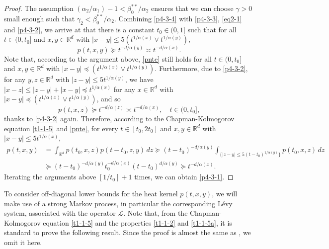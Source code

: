 \documentclass[a4paper,11pt]{amsart}
\renewcommand{\le}{\leqslant}
\newcommand{\R}{\mathds R}
\newcommand{\B}{\beta}
\newcommand{\p}{\preceq}
\newcommand{\q}{\succeq}
\newcommand{\A}{\alpha}
\newcommand{\G}{\gamma}
\def\LL{{\mathcal L}}
\theoremstyle{definition}
\begin{document}
\begin{proof}
The assumption $({\A_2}/{\A_1})-1<{\B_0^{**}}/{\A_2}$ ensures that we can choose
$\G>0$ small enough such that $\G_2 <{\B_0^{**}}/{\A_2}$. Combining \eqref{p4-3-4}
with \eqref{p4-3-3}, \eqref{eq2-1} and \eqref{p4-3-2}, we arrive at that there is a constant $t_0\in(0,1]$ such that for all $t\in (0,t_0]$ and $x,y\in \R^d$ with $|x-y|\le 5(t^{{1}/{\A(x)}}\vee t^{{1}/{\A(y)}})$,
\begin{equation}\label{pnte}
p(t,x,y)\q t^{-{d}/{\A(y)}}\asymp t^{-{d}/{\A(x)}}.
\end{equation}
Note that, according to the argument above, \eqref{pnte} still holds for all $t\in (0,t_0]$ and $x,y\in \R^d$ with $|x-y|\p
(t^{{1}/{\A(x)}}\vee t^{{1}/{\A(y)}})$. Furthermore, due to \eqref{p4-3-2}, for any $y,z\in \R^d$ with $|z-y|\le 5t^{{1}/{\A(y)}}$, we have $|x-z|\le |z-y|+|x-y|\p t^{{1}/{\A(x)}}$ for any $x\in \R^d$ with $|x-y|\p (t^{1/\A(x)}\vee t^{1/\A(y)})$, and so $$p(t,x,z)\q t^{-{d}/{\A(z)}}\asymp t^{-{d}/{\A(x)}},\quad t\in (0,t_0],$$ thanks to \eqref{p4-3-2} again. Therefore, according to the Chapman-Kolmogorov equation
\eqref{t1-1-5} and \eqref{pnte}, for every $t\in [t_0,2t_0]$ and $x,y\in \R^d$ with $|x-y|\le
5t^{{1}/{\A(x)}}$,
\begin{align*}
p(t,x,y)&=\int_{\R^d}p(t_0,x,z)p(t-t_0,z,y)\,dz\q (t-t_0)^{-{d}/{\A(y)}}\int_{\{|z-y|\le 5(t-t_0)^{{1}/{\A(y)}}\}}
p(t_0,x,z)\,dz\\
&\q (t-t_0)^{-{d}/{\A(y)}}t_0^{-{d}/{\A(x)}}(t-t_0)^{{d}/{\A(y)}}\q
t^{-{d}/{\A(x)}}.
\end{align*}
Iterating the arguments above $[{1}/{t_0}]+1$ times, we can
obtain \eqref{p4-3-1}.
\end{proof}


To consider off-diagonal lower bounds for the heat kernel $p(t,x,y)$,  we will make use of a strong Markov process, in particular the corresponding L\'evy system, associated with the operator $\LL$.
Note that, from the Chapman-Kolmogorov equation \eqref{t1-1-5} and the properties \eqref{t1-1-2} and \eqref{t1-1-5a}, it is standard to prove the following result. Since the proof is almost the same as \cite[Theorem 4.5]{CZ},
we omit it here.
\end{document}
